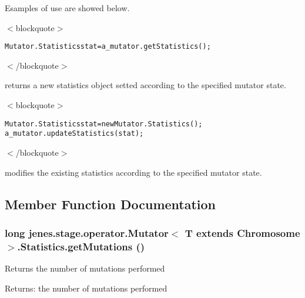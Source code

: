 Esamples of use are showed below. 

$<$blockquote$>$\small\begin{alltt}
 Mutator.Statistics stat = a\_mutator.getStatistics();
 \end{alltt}
\normalsize 
$<$/blockquote$>$ 

returns a new statistics object setted according to the specified mutator state. 

$<$blockquote$>$\small\begin{alltt}
 Mutator.Statistics stat = new Mutator.Statistics();
 a\_mutator.updateStatistics(stat);
 \end{alltt}
\normalsize 
$<$/blockquote$>$ 

modifies the existing statistics according to the specified mutator state. 

\subsection{Member Function Documentation}
\hypertarget{classjenes_1_1stage_1_1operator_1_1_mutator_3_01_t_01extends_01_chromosome_01_4_1_1_statistics_fc74de8d8cf1b0d1cdaf9ec3a170c80e}{
\subsubsection[getMutations]{\setlength{\rightskip}{0pt plus 5cm}long jenes.stage.operator.Mutator$<$ T extends Chromosome $>$.Statistics.getMutations ()}}
\label{classjenes_1_1stage_1_1operator_1_1_mutator_3_01_t_01extends_01_chromosome_01_4_1_1_statistics_fc74de8d8cf1b0d1cdaf9ec3a170c80e}


Returns the number of mutations performed

\begin{Desc}
\item[Returns:]the number of mutations performed \end{Desc}


